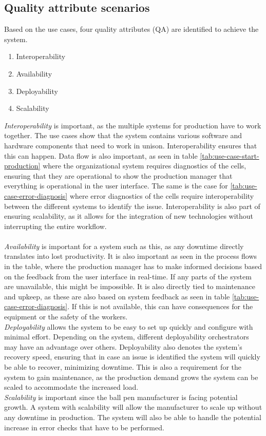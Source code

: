 \subsection{Quality attribute scenarios}
\label{sec:qas}
Based on the use cases, four quality attributes (QA) are identified to achieve the system.
\begin{enumerate}
    \item Interoperability
    \item Availability
    \item Deployability
    \item Scalability
\end{enumerate} 
\textit{Interoperability} is important, as the multiple systems for production have to work together. The use cases show that the system contains various software and hardware components that need to work in unison. Interoperability ensures that this can happen. Data flow is also important, as seen in table \ref{tab:use-case-start-production} where the organizational system requires diagnostics of the cells, ensuring that they are operational to show the production manager that everything is operational in the user interface. The same is the case for \ref{tab:use-case-error-diagnosis} where error diagnostics of the cells require interoperability between the different systems to identify the issue. Interoperability is also part of ensuring scalability, as it allows for the integration of new technologies without interrupting the entire workflow. \\ \\
\textit{Availability} is important for a system such as this, as any downtime directly translates into lost productivity. It is also important as seen in the process flows in the table, where the production manager has to make informed decisions based on the feedback from the user interface in real-time. If any parts of the system are unavailable, this might be impossible. It is also directly tied to maintenance and upkeep, as these are also based on system feedback as seen in table \ref{tab:use-case-error-diagnosis}. If this is not available, this can have consequences for the equipment or the safety of the workers. \\

\textit{Deployability} allows the system to be easy to set up quickly and configure with minimal effort. Depending on the system, different deployability orchestrators may have an advantage over others. Deployability also denotes the system's recovery speed, ensuring that in case an issue is identified the system will quickly be able to recover, minimizing downtime. This is also a requirement for the system to gain maintenance, as the production demand grows the system can be scaled to accommodate the increased load. \\


\textit{Scalability} is important since the ball pen manufacturer is facing potential growth. A system with scalability will allow the manufacturer to scale up without any downtime in production. The system will also be able to handle the potential increase in error checks that have to be performed.
